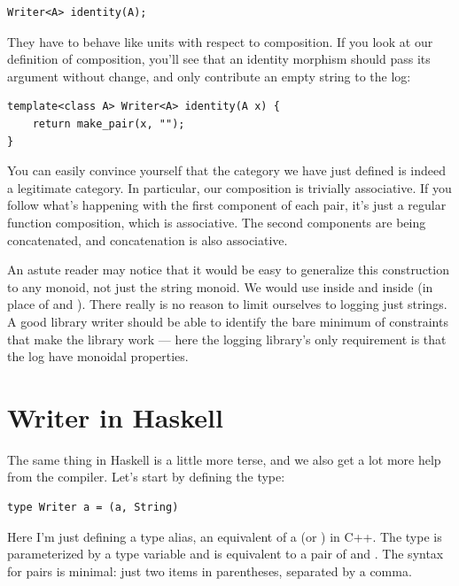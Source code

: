\begin{Verbatim}[commandchars=\\\{\}]
Writer<A> identity(A);
\end{Verbatim}
They have to behave like units with respect to composition. If you look
at our definition of composition, you'll see that an identity morphism
should pass its argument without change, and only contribute an empty
string to the log:

\begin{Verbatim}[commandchars=\\\{\}]
template<class A> Writer<A> identity(A x) {
    return make_pair(x, "");
}
\end{Verbatim}
You can easily convince yourself that the category we have just defined
is indeed a legitimate category. In particular, our composition is
trivially associative. If you follow what's happening with the first
component of each pair, it's just a regular function composition, which
is associative. The second components are being concatenated, and
concatenation is also associative.

An astute reader may notice that it would be easy to generalize this
construction to any monoid, not just the string monoid. We would use
 inside  and  inside
 (in place of \code{+} and ). There really
is no reason to limit ourselves to logging just strings. A good library
writer should be able to identify the bare minimum of constraints that
make the library work --- here the logging library's only requirement is
that the log have monoidal properties.

\section{Writer in Haskell}\label{writer-in-haskell}

The same thing in Haskell is a little more terse, and we also get a lot
more help from the compiler. Let's start by defining the 
type:

\begin{Verbatim}[commandchars=\\\{\}]
type Writer a = (a, String)
\end{Verbatim}
Here I'm just defining a type alias, an equivalent of a 
(or ) in C++. The type  is parameterized by
a type variable  and is equivalent to a pair of  and
. The syntax for pairs is minimal: just two items in
parentheses, separated by a comma.

